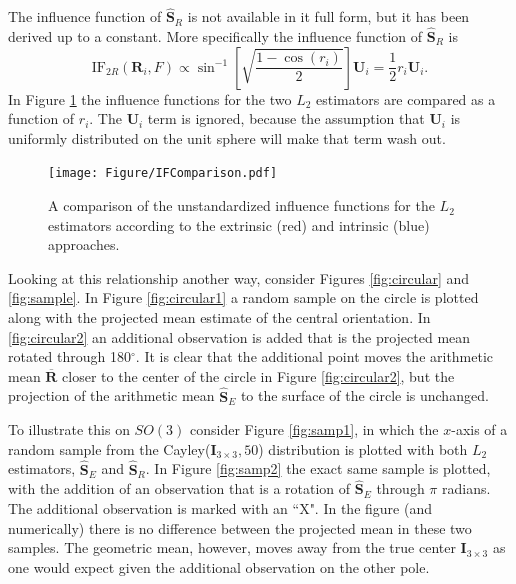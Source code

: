 \documentclass{article}\usepackage{graphicx, color}
\newcommand{\ProjMean}{{\widehat{\bm S}_{E}}}
\newcommand{\GeomMean}{{\widehat{\bm S}_{R}}}
\begin{document}
The influence function of $\GeomMean$ is not available in it full form, but it has been derived up to a constant.  More specifically the influence function of $\GeomMean$ is
\[
\text{IF}_{2R}(\bm R_i,F)\propto\sin^{-1}\left[\sqrt{\frac{1-\cos(r_i)}{2}}\right]\bm U_i= \frac{1}{2}r_i\bm U_i.
\]
In Figure \ref{fig:IFs} the influence functions for the two $L_2$ estimators are compared as a function of $r_i$.  The $\bm U_i$ term is ignored, because the assumption that $\bm U_i$ is uniformly distributed on the unit sphere will make that term wash out.
 
\begin{figure}
\begin{center}
\texttt{[image: Figure/IFComparison.pdf]}
\end{center}\vspace{-1em}
\caption{A comparison of the unstandardized influence functions for the $L_2$ estimators according to the extrinsic (red) and intrinsic (blue) approaches.}
\label{fig:IFs}
\end{figure} 
 
 
Looking at this relationship another way, consider Figures \ref{fig:circular} and \ref{fig:sample}.  In Figure \ref{fig:circular1} a random sample on the circle is plotted along with the projected mean estimate of the central orientation.  In \ref{fig:circular2} an additional observation is added that is the projected mean rotated through 180$^\circ$.  It is clear that the additional point moves the arithmetic mean $\overline{\bm R}$ closer to the center of the circle in Figure \ref{fig:circular2}, but the projection of the arithmetic mean $\ProjMean$ to the surface of the circle is unchanged.

To illustrate this on $SO(3)$ consider Figure \ref{fig:samp1}, in which the $x$-axis of a random sample from the Cayley($\bm I_{3\times 3},50$) distribution is plotted with both $L_2$ estimators, $\ProjMean$ and $\GeomMean$.  In Figure \ref{fig:samp2} the exact same sample is plotted, with the addition of an observation that is a rotation of $\ProjMean$ through $\pi$ radians.  The additional observation is marked with an ``X".  In the figure (and numerically) there is no difference between the projected mean in these two samples.  The geometric mean, however, moves away from the true center $\bm I_{3\times 3}$ as one would expect given the additional observation on the other pole.
\end{document}
